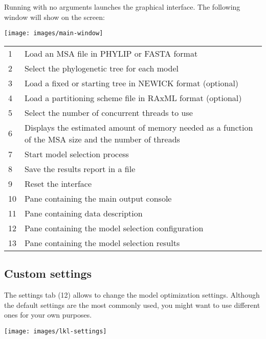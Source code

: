 \documentclass[10pt,twoside,a4paper]{article}
\begin{document}
Running {\modeltestguibin} with no arguments launches the graphical interface.
The following window will show on the screen:

\begin{center}
\texttt{[image: images/main-window]}
\end{center}

\begin{tabular}{l p{}}
  \color{ForestGreen}1 & Load an MSA file in PHYLIP or FASTA format \\
  \color{ForestGreen}2 & Select the phylogenetic tree for each model \\
  \color{ForestGreen}3 & Load a fixed or starting tree in NEWICK format (optional) \\
  \color{ForestGreen}4 & Load a partitioning scheme file in RAxML format (optional) \\
  \color{ForestGreen}5 & Select the number of concurrent threads to use \\
  \color{ForestGreen}6 & Displays the estimated amount of memory needed as a function of the MSA size and the number of threads \\
  \hline
  \color{ForestGreen}7 & Start model selection process \\
  \color{ForestGreen}8 & Save the results report in a file \\
  \color{ForestGreen}9 & Reset the interface \\
  \hline
  \color{RedOrange}10 & Pane containing the main output console \\
  \color{RedOrange}11 & Pane containing data description \\
  \color{RedOrange}12 & Pane containing the model selection configuration \\
  \color{RedOrange}13 & Pane containing the model selection results \\
\end{tabular}

\subsection{Custom settings}

The settings tab ({\color{RedOrange}12}) allows to change the model optimization settings.
Although the default settings are the most commonly used, you might want to use different ones for your own purposes.

\begin{center}
\texttt{[image: images/lkl-settings]}
\end{center}
\end{document}
